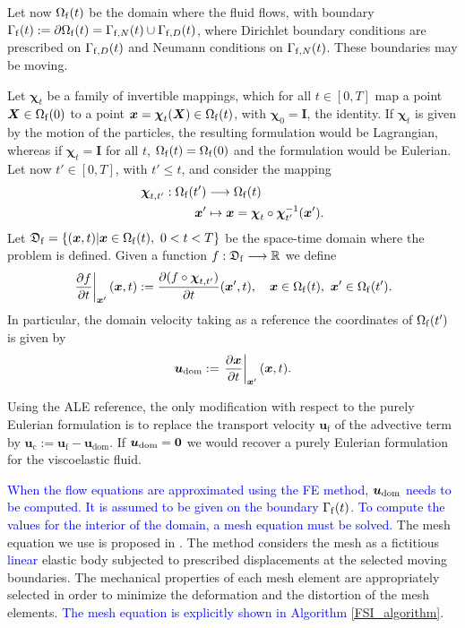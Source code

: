 \documentclass[11pt,english]{article}
\def\boundaryfluid{\Gamma_{\rm{f}}}
\def\Omegafluid{\Omega_{\rm{f}}}
\def\map{{\boldsymbol\chi}}
\def\mapt{{\boldsymbol\chi}_t}
\def\X{\boldsymbol{X}}
\def\x{\boldsymbol{x}}
\def\cl{\nonumber\\}
\def\el{{\nonumber}}
\def\xs{\boldsymbol{x}}
\begin{document}
Let now $\Omegafluid(t)$ be the domain where the fluid flows, with boundary $\boundaryfluid(t) := \partial\Omegafluid(t) = \Gamma_{{\rm{f}},N}(t)\cup \Gamma_{{\rm{f}},D}(t)$, where Dirichlet boundary conditions are prescribed on $\Gamma_{{\rm{f}},D}(t)$ and Neumann conditions on $\Gamma_{{\rm{f}},N}(t)$. These boundaries may be moving.

Let $\mapt$ be a family of invertible mappings, which for all $t\in[0,T]$ map a point $\X\in\Omegafluid(0)$ to a point $\x = \mapt(\X)\in \Omegafluid(t)$, with $\map_0 = {\boldsymbol I}$, the identity. If $\mapt$ is given by the motion of the particles, the resulting formulation would be Lagrangian, whereas if $\mapt = {\boldsymbol I}$ for all $t$,  $\Omegafluid(t) = \Omegafluid(0)$ and the formulation would be Eulerian. Let now $t'\in [0,T]$, with $t'\leq t$, and consider the mapping
\begin{align}
\map_{t,t'} : \Omegafluid(t') & \longrightarrow \Omegafluid(t)\cl
              \x' & \mapsto  \x = \map_t\circ\map_{t'}^{-1}(\x').\el
\end{align}
Let $\mathfrak{D}_{\rm{f}} =\{(\x,t)\vert\x \in\Omegafluid(t),~0<t<T\}$ be the space-time domain where the problem is defined. Given a function $f : \mathfrak{D}_{\rm{f}} \longrightarrow {\mathbb R}$ we define
\begin{align}
\left.\frac{\partial f}{\partial t}\right\vert_{\xs'} (\x,t)
:= \frac{\partial (f\circ\map_{t,t'})}{\partial t}(\x',t),\quad \x\in\Omegafluid(t), ~\x'\in \Omegafluid(t'). \el
\end{align}
In particular, the domain velocity taking as a reference the coordinates of $\Omegafluid(t')$ is given by
\begin{align*}
\boldsymbol{u}_{\rm dom} := \left.\frac{\partial \x}{\partial t}\right\vert_{\xs'} (\x,t). %
\end{align*}

Using the ALE reference, the only modification with respect to the purely Eulerian formulation is to replace the transport velocity $\boldsymbol{u}_{\mathrm{f}}$ of the advective term by $\boldsymbol{u}_{\mathrm{c}} := \boldsymbol{u}_{\mathrm{f}} - \boldsymbol{u}_{\mathrm{dom}}$. If $\boldsymbol{u}_{\mathrm{dom}} = {\bf 0}$ we would recover a purely Eulerian formulation for the viscoelastic fluid.

\textcolor{blue}{When the flow equations are approximated using the FE method, $\boldsymbol{u}_{\rm dom}$ needs to be computed. It is assumed to be given on the boundary $\boundaryfluid(t)$. To compute the values for the interior of the domain, a mesh equation must be solved.} The mesh equation we use is proposed in  \cite{Mesh}. The method considers the mesh as a fictitious \textcolor{blue}{linear} elastic body subjected to prescribed displacements at the selected moving boundaries. The mechanical properties of each mesh element are appropriately selected in order to minimize the deformation and the distortion of the mesh elements. \textcolor{blue}{The mesh equation is explicitly shown in Algorithm \ref{FSI_algorithm}}.
\end{document}
